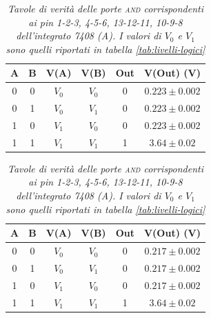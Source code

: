 \begin{table}[H]
  \vspace{.5mm}

\begin{subtable}[H]{0.5\textwidth}
    \centering
    \begin{tabular}[t]{c  c | c  c | c  c}
      \hline
      A & B & V(A) & V(B) & Out & V(Out) (V)\\
      \hline
      0 & 0 & $V_{0}$ & $V_{0}$ & 0 & $0.223 \pm 0.002$ \\
      0 & 1 & $V_{0}$ & $V_{1}$ & 0 & $0.223 \pm 0.002$ \\
      1 & 0 & $V_{1}$ & $V_{0}$ & 0 & $0.223 \pm 0.002$ \\
      1 & 1 & $V_{1}$ & $V_{1}$ & 1 & $3.64 \pm 0.02$ \\
      \hline
    \end{tabular}
  \end{subtable}

  \vspace{.5cm}

  \begin{subtable}[H]{0.5\textwidth}
    \centering
    \begin{tabular}[t]{c  c | c  c | c  c}
      \hline
      A & B & V(A) & V(B) & Out & V(Out) (V)\\
      \hline
      0 & 0 & $V_{0}$ & $V_{0}$ & 0 & $0.217 \pm 0.002$ \\
      0 & 1 & $V_{0}$ & $V_{1}$ & 0 & $0.217 \pm 0.002$ \\
      1 & 0 & $V_{1}$ & $V_{0}$ & 0 & $0.217 \pm 0.002$ \\
      1 & 1 & $V_{1}$ & $V_{1}$ & 1 & $3.64 \pm 0.02$ \\
      \hline
    \end{tabular}
  \end{subtable}
  
  \caption{\emph{Tavole di verità delle porte \textsc{and} corrispondenti ai pin 1-2-3, 4-5-6, 13-12-11, 10-9-8 dell'integrato 7408 (A). I valori di $V_{0}$ e $V_{1}$ sono quelli riportati in tabella \ref{tab:livelli-logici}}}
  \label{tab:and1-multiplexer}
\end{table}


